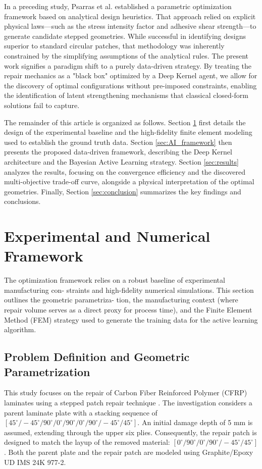 \documentclass[
  preprint,
  12pt,
  a4paper
]{elsarticle}
\begin{document}
In a preceding study, Psarras et al. \cite{psarras2024design} established a parametric optimization framework based on analytical design heuristics. That approach relied on explicit physical laws—such as the stress intensity factor and adhesive shear strength—to generate candidate stepped geometries. While successful in identifying designs superior to standard circular patches, that methodology was inherently constrained by the simplifying assumptions of the analytical rules. The present work signifies a paradigm shift to a purely data-driven strategy. By treating the repair mechanics as a "black box" optimized by a Deep Kernel agent, we allow for the discovery of optimal configurations without pre-imposed constraints, enabling the identification of latent strengthening mechanisms that classical closed-form solutions fail to capture.

The remainder of this article is organized as follows. Section \ref{sec:methodology} first details the design of the experimental baseline and the high-fidelity finite element modeling used to establish the ground truth data. Section \ref{sec:AI_framework} then presents the proposed data-driven framework, describing the Deep Kernel architecture and the Bayesian Active Learning strategy. Section \ref{sec:results} analyzes the results, focusing on the convergence efficiency and the discovered multi-objective trade-off curve, alongside a physical interpretation of the optimal geometries. Finally, Section \ref{sec:conclusion} summarizes the key findings and conclusions.


\section{Experimental and Numerical Framework}
\label{sec:methodology}
The optimization framework relies on a robust baseline of experimental manufacturing con- straints and high-fidelity numerical simulations. This section outlines the geometric parametriza- tion, the manufacturing context (where repair volume serves as a direct proxy for process time), and the Finite Element Method (FEM) strategy used to generate the training data for the active learning algorithm.

\subsection{Problem Definition and Geometric Parametrization}

This study focuses on the repair of Carbon Fiber Reinforced Polymer (CFRP) laminates using a stepped patch repair technique \cite{psarras2024design}. The investigation considers a parent laminate plate with a stacking sequence of $[45^\circ/-45^\circ/90^\circ/0^\circ/90^\circ/0^\circ/90^\circ/-45^\circ/45^\circ]$. An initial damage depth of 5 mm is assumed, extending through the upper six plies. Consequently, the repair patch is designed to match the layup of the removed material: $[0^\circ/90^\circ/0^\circ/90^\circ/-45^\circ/45^\circ]$. Both the parent plate and the repair patch are modeled using Graphite/Epoxy UD IMS 24K 977-2.
\end{document}
